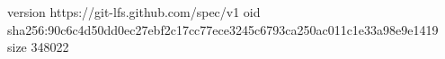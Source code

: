 version https://git-lfs.github.com/spec/v1
oid sha256:90c6c4d50dd0ec27ebf2c17cc77ece3245c6793ca250ac011c1e33a98e9e1419
size 348022
